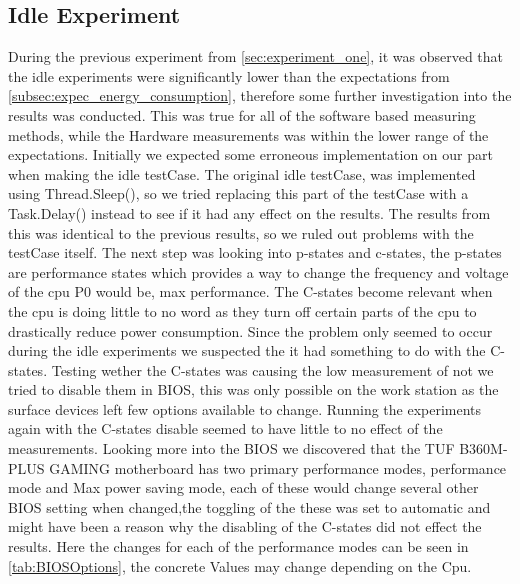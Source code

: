 \subsection{Idle Experiment}
During the previous experiment from \cref{sec:experiment_one}, it was observed that the idle experiments were significantly lower than the expectations from \cref{subsec:expec_energy_consumption}, therefore some further investigation into the results was conducted. This was true for all of the software based measuring methods, while the Hardware measurements was within the lower range of the expectations. Initially we expected some erroneous implementation on our part when making the idle testCase. The original idle testCase, was implemented using Thread.Sleep(), so we tried replacing this part of the testCase with a Task.Delay() instead to see if it had any effect on the results. The results from this was identical to the previous results, so we ruled out problems with the testCase itself. The next step was looking into p-states and c-states\cite[]{PCStat}, the p-states are performance states which provides a way to change the frequency and voltage of the cpu P0 would be, max performance. The C-states become relevant when the cpu is doing little to no word as they turn off certain parts of the cpu to drastically reduce power consumption. Since the problem only seemed to occur during the idle experiments we suspected the it had something to do with the C-states. Testing wether the C-states was causing the low measurement of not we tried to disable them in BIOS, this was only possible on the work station as the surface devices left few options available to change. Running the experiments again with the C-states disable seemed to have little to no effect of the measurements. Looking more into the BIOS we discovered that the TUF B360M-PLUS GAMING motherboard has two primary performance modes, performance mode and Max power saving mode, each of these would change several other BIOS setting when changed,the toggling of the these was set to automatic and might have been a reason why the disabling of the C-states did not effect the results. Here the changes for each of the performance modes can be seen in \cref{tab:BIOSOptions}, the concrete Values may change depending on the Cpu.

